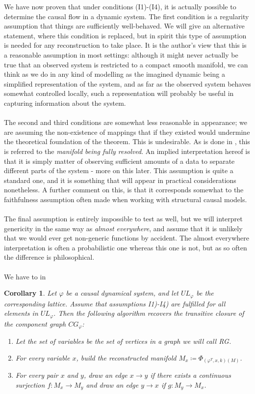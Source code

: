 \documentclass[11pt, a4paper]{memoir}
\theoremstyle{plain}
\newtheorem{cor}{Corollary}
\theoremstyle{definition}
\begin{document}
We have now proven that under conditions (I1)-(I4), it is actually possible to determine the causal flow in a dynamic system. The first condition is a regularity assumption that things are sufficiently well-behaved. We will give an alternative statement, where this condition is replaced, but in spirit this type of assumption is needed for any reconstruction to take place. It is the author's view that this is a reasonable assumption in most settings: although it might never actually be true that an observed system is restricted to a compact smooth manifold, we can think as we do in any kind of modelling as the imagined dynamic being a simplified representation of the system, and as far as the observed system behaves somewhat controlled locally, such a representation will probably be useful in capturing information about the system.\\\\ The second and third conditions are somewhat less reasonable in appearance; we are assuming the non-existence of mappings that if they existed would undermine the theoretical foundation of the theorem. This is undesirable. As is done in \cite{mathFound}, this is referred to the \textit{manifold being fully resolved}. An implied interpretation hereof is that it is simply matter of observing sufficient amounts of a data to separate different parts of the system - more on this later. This assumption is quite a standard one, and it is something that will appear in practical considerations nonetheless. A further comment on this, is that it corresponds somewhat to the faithfulness assumption often made when working with structural causal models.\\\\ The final assumption is entirely impossible to test as well, but we will interpret genericity in the same way as \textit{almost everywhere}, and assume that it is unlikely that we would ever get non-generic functions by accident. The almost everywhere interpretation is often a probabilistic one whereas this one is not, but as so often the difference is philosophical.\\\\
We have to in
\begin{cor}
Let $\varphi$ be a causal dynamical system, and let $UL_\varphi$ be the corresponding lattice. Assume that assumptions I1)-I4) are fulfilled for all elements in $UL_\varphi$. Then the following algorithm recovers the transitive closure of the component graph $CG_\varphi$:
\begin{enumerate}[label=\roman*.]
	\item Let the set of variables be the set of vertices in a graph we will call \emph{RG}.
	\item For every variable $x$, build the reconstructed manifold $M_x\coloneqq \Phi	_{(\varphi^T,x,k)(M)}$.
	\item For every pair $x$ and $y$, draw an edge $x\to y$ if there exists a continuous surjection $f:M_x\to M_y$ and draw an edge $y\to x$ if $g:M_y\to M_x$.
\end{enumerate}
\end{cor}
\end{document}
